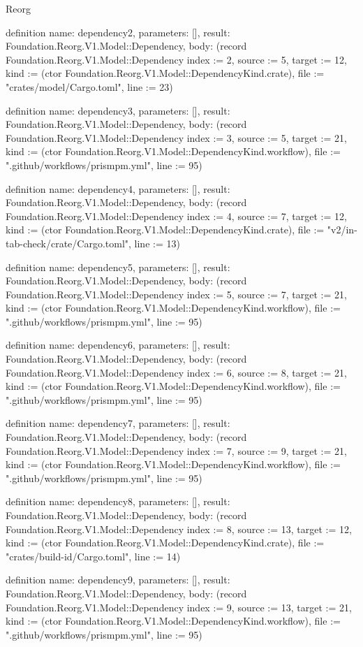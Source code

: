 \begin{lexlean}{Reorg}
\begin{semanticmodule}
definition{
  name: dependency2,
  parameters: [],
  result: Foundation.Reorg.V1.Model::Dependency,
  body: (record Foundation.Reorg.V1.Model::Dependency {index := 2, source := 5, target := 12, kind := (ctor Foundation.Reorg.V1.Model::DependencyKind.crate), file := "crates/model/Cargo.toml", line := 23})
}

definition{
  name: dependency3,
  parameters: [],
  result: Foundation.Reorg.V1.Model::Dependency,
  body: (record Foundation.Reorg.V1.Model::Dependency {index := 3, source := 5, target := 21, kind := (ctor Foundation.Reorg.V1.Model::DependencyKind.workflow), file := ".github/workflows/prismpm.yml", line := 95})
}

definition{
  name: dependency4,
  parameters: [],
  result: Foundation.Reorg.V1.Model::Dependency,
  body: (record Foundation.Reorg.V1.Model::Dependency {index := 4, source := 7, target := 12, kind := (ctor Foundation.Reorg.V1.Model::DependencyKind.crate), file := "v2/in-tab-check/crate/Cargo.toml", line := 13})
}

definition{
  name: dependency5,
  parameters: [],
  result: Foundation.Reorg.V1.Model::Dependency,
  body: (record Foundation.Reorg.V1.Model::Dependency {index := 5, source := 7, target := 21, kind := (ctor Foundation.Reorg.V1.Model::DependencyKind.workflow), file := ".github/workflows/prismpm.yml", line := 95})
}

definition{
  name: dependency6,
  parameters: [],
  result: Foundation.Reorg.V1.Model::Dependency,
  body: (record Foundation.Reorg.V1.Model::Dependency {index := 6, source := 8, target := 21, kind := (ctor Foundation.Reorg.V1.Model::DependencyKind.workflow), file := ".github/workflows/prismpm.yml", line := 95})
}

definition{
  name: dependency7,
  parameters: [],
  result: Foundation.Reorg.V1.Model::Dependency,
  body: (record Foundation.Reorg.V1.Model::Dependency {index := 7, source := 9, target := 21, kind := (ctor Foundation.Reorg.V1.Model::DependencyKind.workflow), file := ".github/workflows/prismpm.yml", line := 95})
}

definition{
  name: dependency8,
  parameters: [],
  result: Foundation.Reorg.V1.Model::Dependency,
  body: (record Foundation.Reorg.V1.Model::Dependency {index := 8, source := 13, target := 12, kind := (ctor Foundation.Reorg.V1.Model::DependencyKind.crate), file := "crates/build-id/Cargo.toml", line := 14})
}

definition{
  name: dependency9,
  parameters: [],
  result: Foundation.Reorg.V1.Model::Dependency,
  body: (record Foundation.Reorg.V1.Model::Dependency {index := 9, source := 13, target := 21, kind := (ctor Foundation.Reorg.V1.Model::DependencyKind.workflow), file := ".github/workflows/prismpm.yml", line := 95})
}


\end{semanticmodule}
\end{lexlean}
